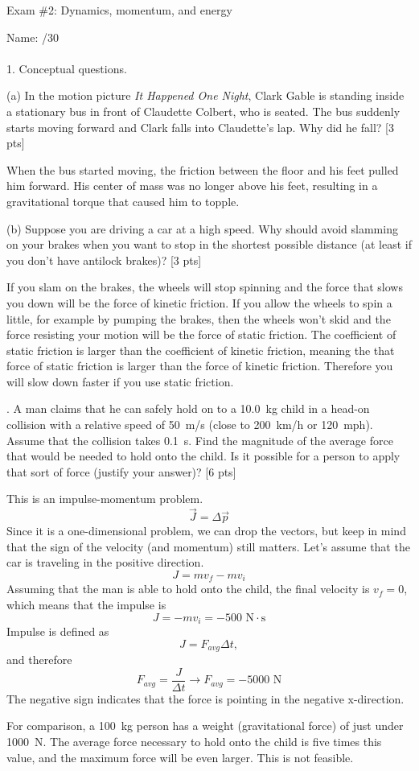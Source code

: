 \documentclass[11pt,letterpaper]{article}
\newcommand{\sol}[1]{{\color{NavyBlue} #1}}
\begin{document}
\setlength{\parindent}{0cm}
\setlength{\parskip}{11pt}
Exam \#2: Dynamics, momentum, and energy

Name: \hfill /30\\

\hrulefill\\
1. Conceptual questions.

(a) In the motion picture \textit{It Happened One Night}, Clark Gable is standing inside a stationary bus in front of Claudette Colbert, who is seated. The bus suddenly starts moving forward and Clark falls into Claudette's lap. Why did he fall? [3 pts]

\sol{When the bus started moving, the friction between the floor and his feet pulled him forward. His center of mass was no longer above his feet, resulting in a gravitational torque that caused him to topple.}
\vspace{5cm}

(b) Suppose you are driving a car at a high speed. Why should avoid slamming on your brakes when you want to stop in the shortest possible distance (at least if you don't have antilock brakes)? [3 pts]

\sol{If you slam on the brakes, the wheels will stop spinning and the force that slows you down will be the force of kinetic friction. If you allow the wheels to spin a little, for example by pumping the brakes, then the wheels won't skid and the force resisting your motion will be the force of static friction. The coefficient of static friction is larger than the coefficient of kinetic friction, meaning the that force of static friction is larger than the force of kinetic friction. Therefore you will slow down faster if you use static friction.}


. A man claims that he can safely hold on to a 10.0~kg child in a head-on collision with a relative speed of 50~m/s (close to 200~km/h or 120~mph). Assume that the collision takes 0.1~s. Find the magnitude of the average force that would be needed to hold onto the child. Is it possible for a person to apply that sort of force (justify your answer)? [6 pts]

\sol{This is an impulse-momentum problem.
$$\vec{J} = \Delta \vec{p}$$
Since it is a one-dimensional problem, we can drop the vectors, but keep in mind that the sign of the velocity (and momentum) still matters. Let's assume that the car is traveling in the positive direction.
$$J = mv_f - mv_i$$
Assuming that the man is able to hold onto the child, the final velocity is $v_f=0$, which means that the impulse is
$$J = -mv_i = -500\mbox{ N}\cdot\mbox{s}$$
Impulse is defined as
$$J=F_{avg}\Delta t,$$
and therefore
$$F_{avg}=\frac{J}{\Delta t} \rightarrow \boxed{F_{avg} = -5000\mbox{ N}}$$
The negative sign indicates that the force is pointing in the negative x-direction.

For comparison, a 100~kg person has a weight (gravitational force) of just under 1000~N. The average force necessary to hold onto the child is five times this value, and the maximum force will be even larger. This is not feasible.

} 
\end{document}
